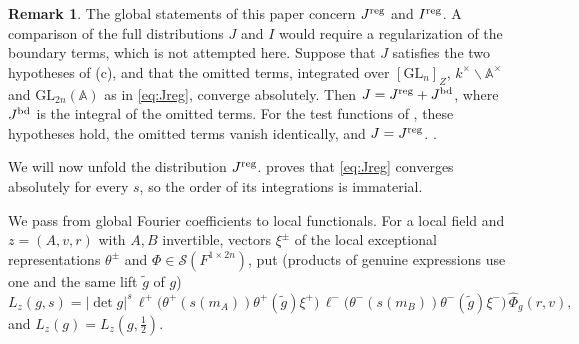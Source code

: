 \documentclass[11pt,oneside,notitlepage]{book}
\numberwithin{equation}{section}
\theoremstyle{plain}
\theoremstyle{definition}
\newtheorem{remark}[theorem]{Remark}
\newcommand{\A}{\mathbb{A}}
\newcommand{\GL}{\mathrm{GL}}
\newcommand{\cS}{\mathcal{S}}
\begin{document}


\begin{remark}
	 The global statements of this paper concern $J^{\rm reg}$ and $I^{\rm reg}$. A comparison of the full distributions $J$ and $I$ would require a regularization of the boundary terms, which is not attempted here. Suppose that $J$ satisfies the two hypotheses of (c), and that the omitted terms, integrated over $[\GL_n]_Z$, $k^\times\backslash\A^\times$ and $\GL_{2n}(\A)$ as in \eqref{eq:Jreg}, converge absolutely. Then $J=J^{\rm reg}+J^{\rm bd}$, where $J^{\rm bd}$ is the integral of the omitted terms. For the test functions of , these hypotheses hold, the omitted terms vanish identically, and $J=J^{\rm reg}$. .
	 \end{remark}
	 
We will now unfold the distribution $J^{\rm reg}$.	  proves that \eqref{eq:Jreg} converges absolutely for every $s$, so the order of its integrations is immaterial.

We pass from global Fourier coefficients to local functionals. For a local field and $z=(A,v,r)$ with $A,B$ invertible, vectors $\xi^\pm$ of the local exceptional representations $\theta^\pm$ and $\Phi\in\cS(F^{1\times2n})$, put (products of genuine expressions use one and the same lift $\tilde g$ of $g$)
\begin{equation}\label{eq:Lz}
L_z(g,s)=|\det g|^s\,\ell^+\bigl(\theta^+(s(m_A))\theta^+(\tilde g)\xi^+\bigr)\,\ell^-\bigl(\theta^-(s(m_B))\theta^-(\tilde g)\xi^-\bigr)\,\widehat\Phi_g(r,v),
\end{equation}
and $L_z(g)=L_z(g,\tfrac12)$.
\end{document}
